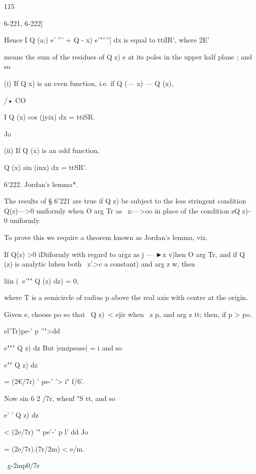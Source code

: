 {115



6-221, 6-222]

Hence I Q (a;) e' ''' + Q - x) e'"''''] dx is equal to ttiIR', where
2E'

means the sum of the residues of Q z) e at its poles in the upper half
plane ; and so

(i) If Q x) is an even function, i.e. if Q (— x) — Q (x),

/• CO

I Q (x) cos (jyix) dx = ttiSR.

Jo

(ii) If Q (x) is an odd function,

Q (x) sin (inx) dx = ttSR'.



6'222. Jordan's lemma*.

The results of § 6'221 are true if Q z) be subject to the less
stringent condition Q(z)—>0 uniformly when O arg Tr as \ z:—>oo in
place of the condition zQ z)- 0 uniformly.

To prove this we require a theorem known as Jordan's lemma, viz.

If Q(z) >0 iDiiformly with regard to argz as j — ►x v)hen O arg Tr,
and if Q (z) is analytic luhen both \ z'.>c a constant) and arg z w,
then

liin (\ e'"" Q (z) dz) = 0,

where T is a semicircle of radius p above the real axis with centre at
the origin.

Given e, choose po so that \ Q z)\ < ejir when \ z p, and arg z tt;
then, if p > po.



 el'Tr)pe-' p ''">dd



e""" Q z) dz But |emipeose| = i and so

e"" Q z) dz



= (2€/7r) ' pe-' '> i" f/6'.



Now sin 6 2 /7r, whenf "S tt, and so



e' ' Q z) dz



< (2e/7r) '" pe'-' p l' dd Jo



= (2e/7r).(7r/2m) < e/m.



\ g-2mp0/7r



}
